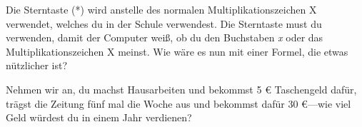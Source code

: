 Die Sterntaste (*) wird anstelle des normalen Multiplikationszeichen \textsf{X} verwendet, welches du in der Schule verwendest. Die Sterntaste must du verwenden, damit der Computer weiß, ob du den Buchstaben \emph{x} oder das Multiplikationszeichen \textsf{X} meinst. Wie wäre es nun mit einer Formel, die etwas nützlicher ist?

Nehmen wir an, du machst Hausarbeiten und bekommst 5 € Taschengeld dafür, trägst die Zeitung fünf mal die Woche aus und bekommst dafür 30 €---wie viel Geld würdest du in einem Jahr verdienen?

